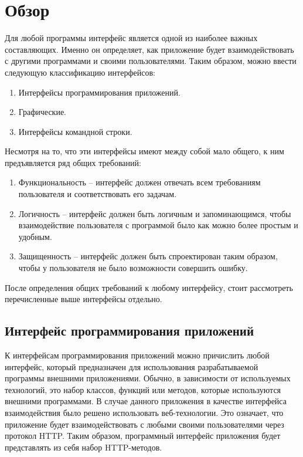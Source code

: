 \section*{Обзор}

Для любой программы интерфейс является одной из наиболее важных составляющих.
Именно он определяет, как приложение будет взаимодействовать с другими
программами и своими пользователями. Таким образом, можно ввести следующую
классификацию интерфейсов:

\begin{enumerate}
    \item Интерфейсы программирования приложений.
    \item Графические.
    \item Интерфейсы командной строки.
\end{enumerate}

Несмотря на то, что эти интерфейсы имеют между собой мало общего, к ним 
предъявляется ряд общих требований:

\begin{enumerate}
    \item Функциональность -- интерфейс должен отвечать всем требованиям пользователя и соответствовать его задачам.
    \item Логичность -- интерфейс должен быть логичным и запоминающимся, чтобы взаимодействие пользователя
        с программой было как можно более простым и удобным.
    \item Защищенность -- интерфейс должен быть спроектирован таким образом, чтобы у пользователя не было
        возможности совершить ошибку.
\end{enumerate}

После определения общих требований к любому интерфейсу, стоит рассмотреть перечисленные выше
интерфейсы отдельно.

\subsection*{Интерфейс программирования приложений}

К интерфейсам программирования приложений можно причислить любой интерфейс, который предназначен для
использования разрабатываемой программы внешними приложениями. Обычно, в зависимости от
используемых технологий, это набор классов, функций или методов, которые используются
внешними программами. В случае данного приложения в качестве интерфейса взаимодействия
было решено использовать веб-технологии. Это означает, что приложение будет взаимодействовать
с любыми своими пользователями через протокол HTTP\cite{RFC2616}.
Таким образом, программный интерфейс приложения будет представлять из себя набор HTTP-методов.

